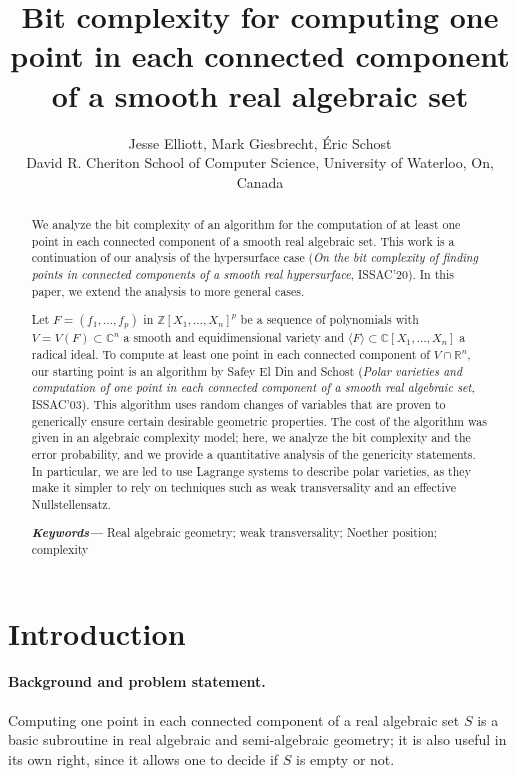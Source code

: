\documentclass[12pt]{article}
\title{Bit complexity for computing one point in each connected component of a smooth real algebraic set}
\author{Jesse Elliott, Mark Giesbrecht, \'Eric Schost  \\
  \small David R. Cheriton School of Computer Science, University of Waterloo, On, Canada \\
}
\date{} %
\def\C{\mathbb{C}}
\providecommand{\keywords}[1]
{
  \small	
  \textbf{\textit{Keywords---}} #1
}
\begin{document}
%
\maketitle
%
%
%
\begin{abstract}
We analyze the bit complexity of an algorithm for the computation of
at least one point in each connected component of a smooth real
algebraic set. This work is a continuation of our analysis of the
hypersurface case ({\em On the bit complexity of finding points in
  connected components of a smooth real hypersurface}, ISSAC'20). In
this paper, we extend the analysis to more general cases.

Let $F=(f_1,\hdots, f_p)$ in $\mathbb{Z}[X_1, \hdots , X_n]^p$ be a
sequence of polynomials with $V = V(F) \subset \C^n$ a smooth and
equidimensional variety and $\langle F \rangle \subset \C[X_1, \hdots
  , X_n]$ a radical ideal. To compute at least one point in each
connected component of $V \cap \mathbb{R}^n$, our starting point is an
algorithm by Safey El Din and Schost ({\em Polar varieties and
  computation of one point in each connected component of a smooth
  real algebraic set}, ISSAC'03). This algorithm uses random changes
of variables that are proven to generically ensure certain desirable
geometric properties. The cost of the algorithm was given in an
algebraic complexity model; here, we analyze the bit complexity and
the error probability, and we provide a quantitative analysis of the
genericity statements. In particular, we are led to use Lagrange
systems to describe polar varieties, as they make it simpler to
rely on techniques such as weak transversality and an effective 
Nullstellensatz.

\keywords{Real algebraic geometry; weak transversality; Noether
  position; complexity}
\end{abstract}
%


\section{Introduction}

\paragraph*{Background and problem statement.}
Computing one point in each connected component of a real algebraic
set $S$ is a basic subroutine in real algebraic and semi-algebraic
geometry; it is also useful in its own right, since it allows one to
decide if $S$ is empty or not. 
\end{document}

